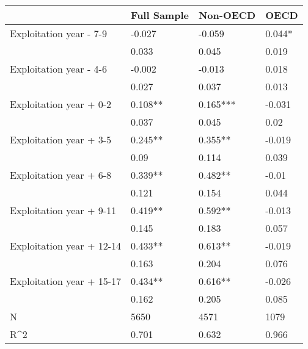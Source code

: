 \begin{tabular}{llll}
\toprule
                          & Full Sample & Non-OECD &   OECD \\
\midrule
  Exploitation year - 7-9 &      -0.027 &   -0.059 & 0.044* \\
                          &       0.033 &    0.045 &  0.019 \\
  Exploitation year - 4-6 &      -0.002 &   -0.013 &  0.018 \\
                          &       0.027 &    0.037 &  0.013 \\
  Exploitation year + 0-2 &     0.108** & 0.165*** & -0.031 \\
                          &       0.037 &    0.045 &   0.02 \\
  Exploitation year + 3-5 &     0.245** &  0.355** & -0.019 \\
                          &        0.09 &    0.114 &  0.039 \\
  Exploitation year + 6-8 &     0.339** &  0.482** &  -0.01 \\
                          &       0.121 &    0.154 &  0.044 \\
 Exploitation year + 9-11 &     0.419** &  0.592** & -0.013 \\
                          &       0.145 &    0.183 &  0.057 \\
Exploitation year + 12-14 &     0.433** &  0.613** & -0.019 \\
                          &       0.163 &    0.204 &  0.076 \\
Exploitation year + 15-17 &     0.434** &  0.616** & -0.026 \\
                          &       0.162 &    0.205 &  0.085 \\
                        N &        5650 &     4571 &   1079 \\
                      R\textasciicircum 2 &       0.701 &    0.632 &  0.966 \\
\bottomrule
\end{tabular}
